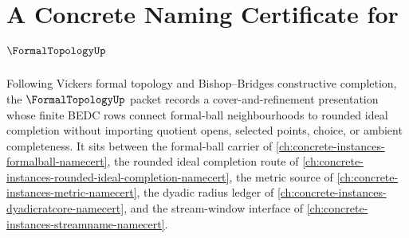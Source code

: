\chapter{A Concrete Naming Certificate for $\FormalTopologyUp$}
\label{ch:concrete-instances-formal-topology-namecert}

Following Vickers formal topology and Bishop--Bridges constructive completion, the $\FormalTopologyUp$ packet records a cover-and-refinement presentation whose finite BEDC rows connect formal-ball neighbourhoods to rounded ideal completion without importing quotient opens, selected points, choice, or ambient completeness. It sits between the formal-ball carrier of \autoref{ch:concrete-instances-formalball-namecert}, the rounded ideal completion route of \autoref{ch:concrete-instances-rounded-ideal-completion-namecert}, the metric source of \autoref{ch:concrete-instances-metric-namecert}, the dyadic radius ledger of \autoref{ch:concrete-instances-dyadicratcore-namecert}, and the stream-window interface of \autoref{ch:concrete-instances-streamname-namecert}.

